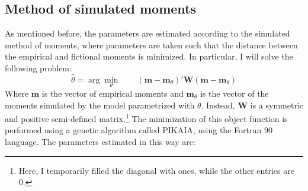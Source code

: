 \documentclass[12pt]{article}
\begin{document}
\subsection{Method of simulated moments}
As mentioned before, the parameters are estimated according to the simulated method of moments, where parameters are taken such that the distance between the empirical and fictional moments is minimized. In particular, I will solve the following problem:
\begin{equation}
\hat{\theta}=\arg\min_\theta \quad\quad (\mathbf{m}-\mathbf{m}_\theta)'\mathbf{W}(\mathbf{m}-\mathbf{m}_\theta)
\end{equation}
Where $\mathbf{m}$ is the vector of empirical moments and $\mathbf{m}_\theta$ is the vector of the moments simulated by the model parametrized with $\theta$. Instead, $\mathbf{W}$ is a symmetric and positive semi-defined matrix.\footnote{Here, I temporarily filled the diagonal with ones, while the other entries are 0. }  The minimization of this object function is performed using a genetic algorithm called PIKAIA, using the Fortran 90 language. The parameters estimated in this way are:
\end{document}
